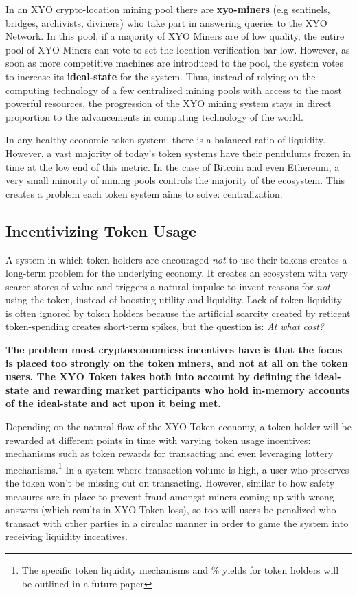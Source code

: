 \documentclass{article}
\begin{document}
In an XYO crypto-location mining pool there are \textbf{\Glspl{xyo-miner}} (e.g \Glspl{sentinel}, \Glspl{bridge}, \Glspl{archivist}, \Glspl{diviner}) who take part in answering queries to the XYO Network. In this pool, if a majority of XYO Miners are of low quality, the entire pool of XYO Miners can vote to set the location-verification bar low. However, as soon as more competitive machines are introduced to the pool, the system votes to increase its \textbf{\gls{ideal-state}} for the system. Thus, instead of relying on the computing technology of a few centralized mining pools with access to the most powerful resources, the progression of the XYO mining system stays in direct proportion to the advancements in computing technology of the world.

In any healthy economic token system, there is a balanced ratio of liquidity. However, a vast majority of today's token systems have their pendulums frozen in time at the low end of this metric. In the case of Bitcoin and even Ethereum, a very small minority of mining pools controls the majority of the ecosystem. This creates a problem each token system aims to solve: centralization.

\subsection{Incentivizing Token Usage}

A system in which token holders are encouraged \textit{not} to use their tokens creates a long-term problem for the underlying economy. It creates an ecosystem with very scarce stores of value and triggers a natural impulse to invent reasons for \textit{not} using the token, instead of boosting utility and liquidity. Lack of token liquidity is often ignored by token holders because the artificial scarcity created by reticent token-spending creates short-term spikes, but the question is: \textit{At what cost?}

\textbf{The problem most \glspl{cryptoeconomics} incentives have is that the focus is placed too strongly on the token miners, and not at all on the token users. The XYO Token takes both into account by defining the \gls{ideal-state} and rewarding market participants who hold in-memory accounts of the ideal-state and act upon it being met.}

Depending on the natural flow of the XYO Token economy, a token holder will be rewarded at different points in time with varying token usage incentives: mechanisms such as token rewards for transacting and even leveraging lottery mechanisms.\footnote{The specific token liquidity mechanisms and \% yields for token holders will be outlined in a future paper} In a system where transaction volume is high, a user who preserves the token won't be missing out on transacting. However, similar to how safety measures are in place to prevent fraud amongst miners coming up with wrong answers (which results in XYO Token loss), so too will users be penalized who transact with other parties in a circular manner in order to game the system into receiving liquidity incentives.
\end{document}
